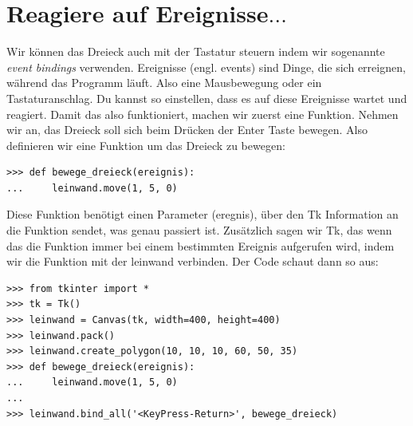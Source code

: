\section{Reagiere auf Ereignisse$\ldots$}

Wir können das Dreieck auch mit der Tastatur steuern indem wir sogenannte \emph{event bindings} verwenden. Ereignisse (engl. events) sind Dinge, die sich erreignen, während das Programm läuft. Also eine Mausbewegung oder ein Tastaturanschlag. Du kannst  so einstellen, dass es auf diese Ereignisse wartet und reagiert. Damit das also funktioniert, machen wir zuerst eine Funktion. Nehmen wir an, das Dreieck soll sich beim Drücken der Enter Taste bewegen. Also definieren wir eine Funktion um das Dreieck zu bewegen:

\begin{Verbatim}[frame=single]
>>> def bewege_dreieck(ereignis):
...     leinwand.move(1, 5, 0)
\end{Verbatim}

Diese Funktion benötigt einen Parameter (eregnis), über den Tk Information an die Funktion sendet, was genau passiert ist. Zusätzlich sagen wir Tk, das wenn das die Funktion immer bei einem bestimmten Ereignis aufgerufen wird, indem wir die  Funktion mit der leinwand verbinden. Der Code schaut dann so aus:

\begin{Verbatim}[frame=single]
>>> from tkinter import *
>>> tk = Tk()
>>> leinwand = Canvas(tk, width=400, height=400)
>>> leinwand.pack()
>>> leinwand.create_polygon(10, 10, 10, 60, 50, 35)
>>> def bewege_dreieck(ereignis):
...     leinwand.move(1, 5, 0)
...
>>> leinwand.bind_all('<KeyPress-Return>', bewege_dreieck)
\end{Verbatim}

